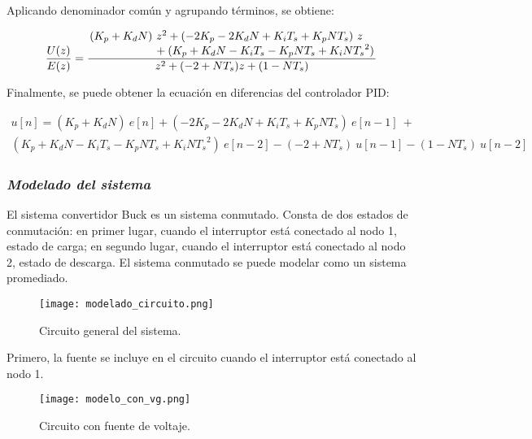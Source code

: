 Aplicando denominador común y agrupando términos, se obtiene:

\vspace{-0.5cm}
\begin{equation}
    \dfrac{U(z)}{E(z)} =
    \frac
    {
        \splitfrac{
            (K_p + K_d N)\ z^2 + (-2 K_p - 2 K_d N + K_i T_s + K_p N T_s)\ z
        }{
            + (K_p + K_d N - K_i T_s - K_p N T_s + K_i N {T_s}^2)
        }
    }
    {
            z^2 + (-2 + N T_s) z + (1 - N T_s)
    }
    \end{equation}
\vspace{-0.5cm}

Finalmente, se puede obtener la ecuación en diferencias del controlador PID:

\vspace{-0.5cm}
\begin{multline}
        u[n] = (K_p + K_d N)\ e[n] + (-2 K_p - 2 K_d N + K_i T_s + K_p N T_s)\ e[n-1]\  + \\
    (K_p + K_d N - K_i T_s - K_p N T_s + K_i N {T_s}^2)\ e[n-2] - (-2 + N T_s)\ u[n-1] - (1 - N T_s)\ u[n-2]
\end{multline}
\vspace{-0.5cm}

\subsubsection*{\it{Modelado del sistema}}
\vspace{-0.25cm}

El sistema convertidor Buck es un sistema conmutado. Consta de dos estados de conmutación: 
en primer lugar, cuando el interruptor está conectado al nodo 1, estado de carga; en segundo lugar, cuando
el interruptor está conectado al nodo 2, estado de descarga.
El sistema conmutado se puede modelar como un sistema promediado.

\begin{figure}[H]
    \centering
    \texttt{[image: modelado\_circuito.png]}
    \vspace{-0.25cm}
    \caption{Circuito general del sistema.}
    \label{fig:modelado_circuito}
\end{figure}

Primero, la fuente se incluye en el circuito cuando el interruptor está conectado al nodo 1.

\begin{figure}[H]
    \centering
    \texttt{[image: modelo\_con\_vg.png]}
    \vspace{-0.25cm}
    \caption{Circuito con fuente de voltaje.}
    \label{fig:modelado_con_vg}
\end{figure}

